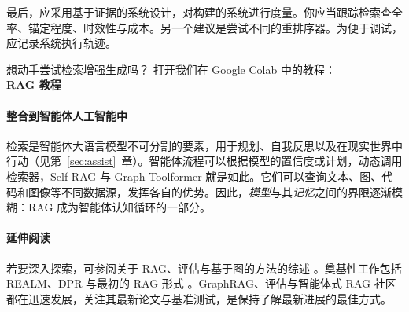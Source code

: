 最后，应采用基于证据的系统设计，对构建的系统进行度量。你应当跟踪检索查全率、锚定程度、时效性与成本。另一个建议是尝试不同的重排序器。为便于调试，应记录系统执行轨迹。



\begin{tcolorbox}[
    colback=blue!10!white,
    colframe=blue!85!black,
    title={\faRocket\quad 亲自试一试！},
    fonttitle=\bfseries,
    coltitle=white,
    boxrule=1pt,
    arc=4pt,
    left=5pt,
    right=5pt,
    top=5pt,
    bottom=5pt,
    enhanced
]
想动手尝试检索增强生成吗？
打开我们在 Google Colab 中的教程：\\
\href{https://colab.research.google.com/github/Agentic-LLMs/Agentic-AI-tutorials/blob/main/rag_tutorial.ipynb}{\faCode\quad \textbf{RAG 教程}}
\end{tcolorbox}

\paragraph{整合到智能体人工智能中} 检索是智能体大语言模型不可分割的要素，用于规划、自我反思以及在现实世界中行动（见第~\ref{sec:assist}~章）。智能体流程可以根据模型的置信度或计划，动态调用检索器，Self-RAG 与 Graph Toolformer 就是如此。它们可以查询文本、图、代码和图像等不同数据源，发挥各自的优势。因此，{\em 模型}与其{\em 记忆}之间的界限逐渐模糊：RAG 成为智能体认知循环的一部分。

\paragraph{延伸阅读} 若要深入探索，可参阅关于 RAG、评估与基于图的方法的综述 \citep{gao2023rag_survey,huang2024rag_survey,yu2024rag_eval,sharma2025rag_survey,peng2024graphrag_survey}。奠基性工作包括 REALM、DPR 与最初的 RAG 形式 \citep{guu2020realm,karpukhin2020dense,lewis2020retrieval}。GraphRAG、评估与智能体式 RAG 社区都在迅速发展，关注其最新论文与基准测试，是保持了解最新进展的最佳方式。




